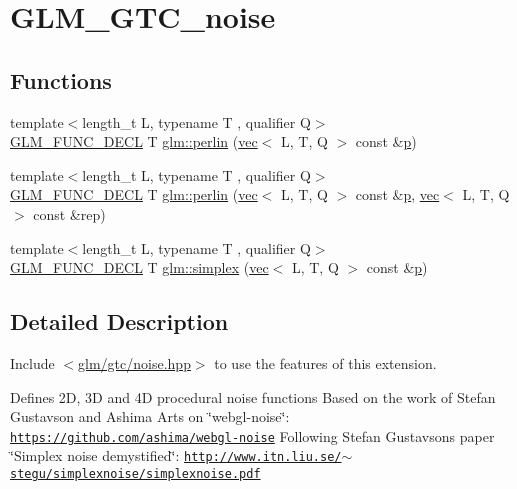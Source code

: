 \hypertarget{group__gtc__noise}{}\section{G\+L\+M\+\_\+\+G\+T\+C\+\_\+noise}
\label{group__gtc__noise}
\subsection*{Functions}
\begin{DoxyCompactItemize}
\item 
{\footnotesize template$<$length\+\_\+t L, typename T , qualifier Q$>$ }\\\hyperlink{setup_8hpp_ab2d052de21a70539923e9bcbf6e83a51}{G\+L\+M\+\_\+\+F\+U\+N\+C\+\_\+\+D\+E\+CL} T \hyperlink{group__gtc__noise_ga1e043ce3b51510e9bc4469227cefc38a}{glm\+::perlin} (\hyperlink{structglm_1_1vec}{vec}$<$ L, T, Q $>$ const \&\hyperlink{_s_d_l__opengl__glext_8h_aa5367c14d90f462230c2611b81b41d23}{p})
\item 
{\footnotesize template$<$length\+\_\+t L, typename T , qualifier Q$>$ }\\\hyperlink{setup_8hpp_ab2d052de21a70539923e9bcbf6e83a51}{G\+L\+M\+\_\+\+F\+U\+N\+C\+\_\+\+D\+E\+CL} T \hyperlink{group__gtc__noise_gac270edc54c5fc52f5985a45f940bb103}{glm\+::perlin} (\hyperlink{structglm_1_1vec}{vec}$<$ L, T, Q $>$ const \&\hyperlink{_s_d_l__opengl__glext_8h_aa5367c14d90f462230c2611b81b41d23}{p}, \hyperlink{structglm_1_1vec}{vec}$<$ L, T, Q $>$ const \&rep)
\item 
{\footnotesize template$<$length\+\_\+t L, typename T , qualifier Q$>$ }\\\hyperlink{setup_8hpp_ab2d052de21a70539923e9bcbf6e83a51}{G\+L\+M\+\_\+\+F\+U\+N\+C\+\_\+\+D\+E\+CL} T \hyperlink{group__gtc__noise_ga8122468c69015ff397349a7dcc638b27}{glm\+::simplex} (\hyperlink{structglm_1_1vec}{vec}$<$ L, T, Q $>$ const \&\hyperlink{_s_d_l__opengl__glext_8h_aa5367c14d90f462230c2611b81b41d23}{p})
\end{DoxyCompactItemize}


\subsection{Detailed Description}
Include $<$\hyperlink{noise_8hpp}{glm/gtc/noise.\+hpp}$>$ to use the features of this extension.

Defines 2D, 3D and 4D procedural noise functions Based on the work of Stefan Gustavson and Ashima Arts on \char`\"{}webgl-\/noise\char`\"{}\+: \href{https://github.com/ashima/webgl-noise}{\tt https\+://github.\+com/ashima/webgl-\/noise} Following Stefan Gustavson\textquotesingle{}s paper \char`\"{}\+Simplex noise demystified\char`\"{}\+: \href{http://www.itn.liu.se/~stegu/simplexnoise/simplexnoise.pdf}{\tt http\+://www.\+itn.\+liu.\+se/$\sim$stegu/simplexnoise/simplexnoise.\+pdf} 


